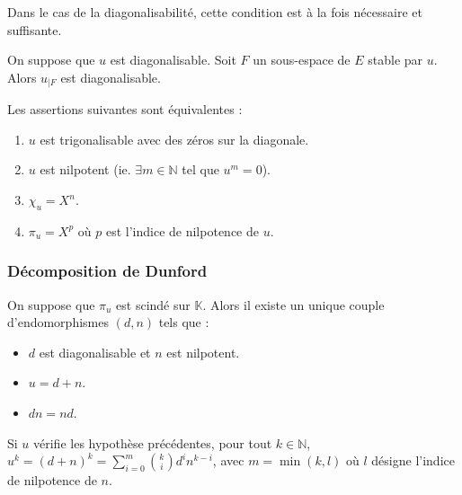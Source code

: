  \begin{remark}
    Dans le cas de la diagonalisabilité, cette condition est à la fois nécessaire et suffisante.
  \end{remark}


  \begin{proposition}
    On suppose que $u$ est diagonalisable. Soit $F$ un sous-espace de $E$ stable par $u$. Alors $u_{|F}$ est diagonalisable.
  \end{proposition}


  \begin{application}
    Les assertions suivantes sont équivalentes :
    \begin{enumerate}[label=(\roman*)]
      \item $u$ est trigonalisable avec des zéros sur la diagonale.
      \item $u$ est nilpotent (ie. $\exists m \in \mathbb{N}$ tel que $u^m = 0$).
      \item $\chi_u = X^n$.
      \item $\pi_u = X^p$ où $p$ est l'indice de nilpotence de $u$.
    \end{enumerate}
  \end{application}

  \subsubsection{Décomposition de Dunford}


  \begin{theorem}
    On suppose que $\pi_u$ est scindé sur $\mathbb{K}$. Alors il existe un unique couple d'endomorphismes $(d, n)$ tels que :
    \begin{itemize}
      \item $d$ est diagonalisable et $n$ est nilpotent.
      \item $u = d + n$.
      \item $d n = n d$.
    \end{itemize}
  \end{theorem}

  \begin{corollary}
    Si $u$ vérifie les hypothèse précédentes, pour tout $k \in \mathbb{N}$, $u^k = (d + n)^k = \sum_{i=0}^m \binom{k}{i} d^i n^{k-i}$, avec $m = \min(k, l)$ où $l$ désigne l'indice de nilpotence de $n$.
  \end{corollary}


